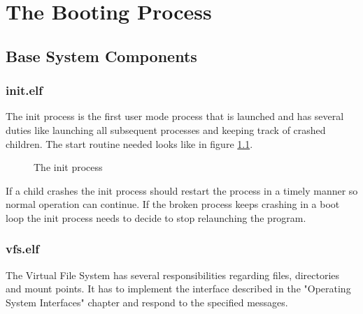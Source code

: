\chapter{The Booting Process}
\section{Base System Components}

\subsection{init.elf}
The init process is the first user mode process that is launched and has several duties like launching all
subsequent processes and keeping track of crashed children. The start routine needed looks like in figure
\ref{fig:initprocess}.


\begin{figure}[h!]
\centering
\scalebox{0.8}{}
\caption{The init process}
\label{fig:initprocess}
\end{figure}

If a child crashes the init process should restart the process in a timely manner so normal operation can
continue. If the broken process keeps crashing in a boot loop the init process needs to decide to
stop relaunching the program.

\subsection{vfs.elf}
The Virtual File System has several responsibilities regarding files, directories and mount points.
It has to implement the interface described in the "Operating System Interfaces" chapter and respond to the
specified messages.

